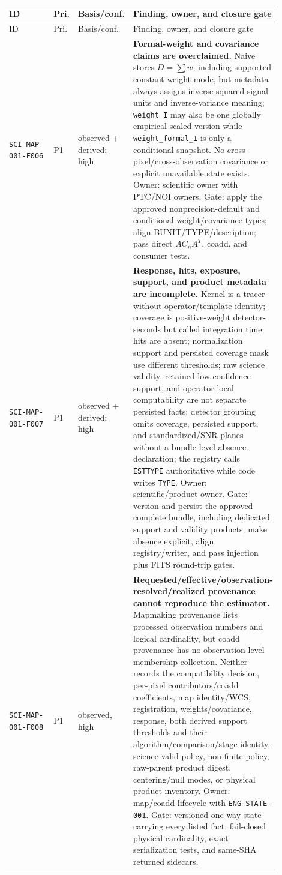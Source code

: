 \documentclass[11pt]{article}
\newcommand{\code}[1]{\nolinkurl{#1}}
\begin{document}
\begin{longtable}{L{0.20\linewidth}L{0.06\linewidth}L{0.15\linewidth}L{0.49\linewidth}}
\toprule
ID & Pri. & Basis/conf. & Finding, owner, and closure gate\\
\midrule
\endfirsthead
\toprule
ID & Pri. & Basis/conf. & Finding, owner, and closure gate\\
\midrule
\endhead
\code{SCI-MAP-001-F006} & P1 & observed + derived; high &
\textbf{Formal-weight and covariance claims are overclaimed.}  Naive stores
\(D=\sum w\), including supported constant-weight mode, but metadata always
assigns inverse-squared signal units and inverse-variance meaning;
\code{weight_I} may also be one globally empirical-scaled version while
\code{weight_formal_I} is only a conditional snapshot.  No
cross-pixel/cross-observation covariance or explicit unavailable state exists.
Owner: scientific owner with PTC/NOI owners.  Gate: apply the approved
nonprecision-default and conditional weight/covariance types; align
BUNIT/TYPE/description; pass direct \(AC_nA^T\), coadd, and consumer tests.\\
\code{SCI-MAP-001-F007} & P1 & observed + derived; high &
\textbf{Response, hits, exposure, support, and product metadata are incomplete.}
Kernel is a tracer without operator/template identity; coverage is
positive-weight detector-seconds but called integration time; hits are absent;
normalization support and persisted coverage mask use different thresholds;
raw science validity, retained low-confidence support, and operator-local
computability are not separate persisted facts;
detector grouping omits coverage, persisted support, and standardized/SNR
planes without a bundle-level absence declaration; the registry calls
\code{ESTTYPE} authoritative while code writes \code{TYPE}.
Owner: scientific/product owner.  Gate: version and persist the approved
complete bundle, including dedicated support and validity products; make
absence explicit, align registry/writer, and pass injection plus FITS
round-trip gates.\\
\code{SCI-MAP-001-F008} & P1 & observed, high &
\textbf{Requested/effective/observation-resolved/realized provenance cannot
reproduce the estimator.}  Mapmaking provenance lists processed observation
numbers and logical cardinality, but coadd provenance has no observation-level
membership collection.  Neither records the compatibility decision,
per-pixel contributors/coadd coefficients, map identity/WCS, registration,
weights/covariance, response, both derived support thresholds and their
algorithm/comparison/stage identity, science-valid policy, non-finite policy,
raw-parent product digest, centering/null modes, or physical product inventory.
Owner: map/coadd lifecycle with
\texttt{ENG-STATE-001}.  Gate: versioned one-way state carrying every listed
fact, fail-closed physical cardinality, exact serialization tests, and same-SHA
returned sidecars.\\
\bottomrule
\end{longtable}
\end{document}
